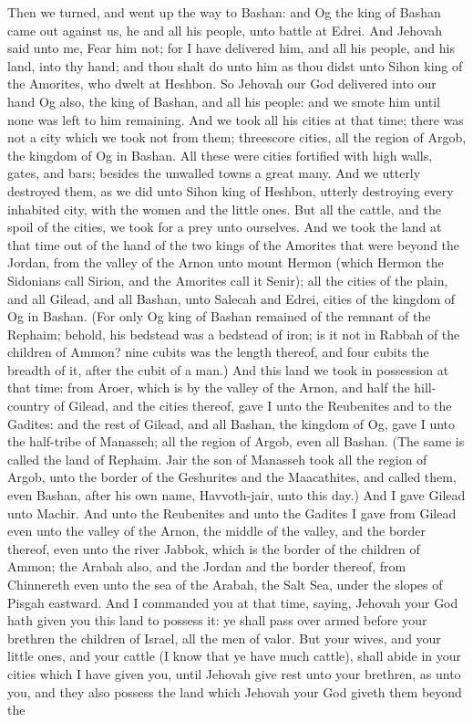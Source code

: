 Then we turned, and went up the way to Bashan: and Og the king of Bashan came out against us, he and all his people, unto battle at Edrei. And Jehovah said unto me, Fear him not; for I have delivered him, and all his people, and his land, into thy hand; and thou shalt do unto him as thou didst unto Sihon king of the Amorites, who dwelt at Heshbon. So Jehovah our God delivered into our hand Og also, the king of Bashan, and all his people: and we smote him until none was left to him remaining. And we took all his cities at that time; there was not a city which we took not from them; threescore cities, all the region of Argob, the kingdom of Og in Bashan. All these were cities fortified with high walls, gates, and bars; besides the unwalled towns a great many. And we utterly destroyed them, as we did unto Sihon king of Heshbon, utterly destroying every inhabited city, with the women and the little ones. But all the cattle, and the spoil of the cities, we took for a prey unto ourselves. And we took the land at that time out of the hand of the two kings of the Amorites that were beyond the Jordan, from the valley of the Arnon unto mount Hermon (which Hermon the Sidonians call Sirion, and the Amorites call it Senir); all the cities of the plain, and all Gilead, and all Bashan, unto Salecah and Edrei, cities of the kingdom of Og in Bashan. (For only Og king of Bashan remained of the remnant of the Rephaim; behold, his bedstead was a bedstead of iron; is it not in Rabbah of the children of Ammon? nine cubits was the length thereof, and four cubits the breadth of it, after the cubit of a man.)  And this land we took in possession at that time: from Aroer, which is by the valley of the Arnon, and half the hill-country of Gilead, and the cities thereof, gave I unto the Reubenites and to the Gadites: and the rest of Gilead, and all Bashan, the kingdom of Og, gave I unto the half-tribe of Manasseh; all the region of Argob, even all Bashan. (The same is called the land of Rephaim. Jair the son of Manasseh took all the region of Argob, unto the border of the Geshurites and the Maacathites, and called them, even Bashan, after his own name, Havvoth-jair, unto this day.) And I gave Gilead unto Machir. And unto the Reubenites and unto the Gadites I gave from Gilead even unto the valley of the Arnon, the middle of the valley, and the border thereof, even unto the river Jabbok, which is the border of the children of Ammon; the Arabah also, and the Jordan and the border thereof, from Chinnereth even unto the sea of the Arabah, the Salt Sea, under the slopes of Pisgah eastward.  And I commanded you at that time, saying, Jehovah your God hath given you this land to possess it: ye shall pass over armed before your brethren the children of Israel, all the men of valor. But your wives, and your little ones, and your cattle (I know that ye have much cattle), shall abide in your cities which I have given you, until Jehovah give rest unto your brethren, as unto you, and they also possess the land which Jehovah your God giveth them beyond the 